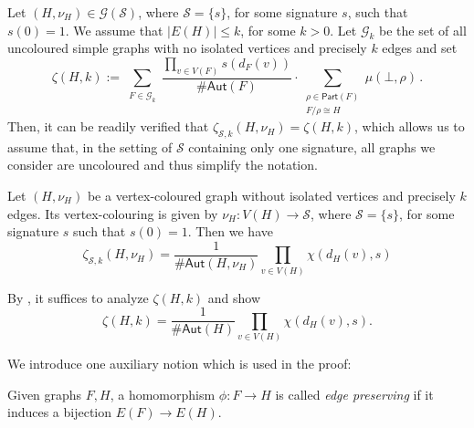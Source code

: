 \documentclass[authorcolumns,numberwithinsect]{no-lipics-v2022}
\begin{document}
\begin{remark}\label{rem:simplified_single_signature}
Let $(H, \nu_H) \in \mathcal{G}(\mathcal{S})$, where $\mathcal{S} = \{s\}$, for some signature $s$, such that $s(0) = 1$. We assume that $|E(H)| \leq k$, for some $k > 0$. Let $\mathcal{G}_k$ be the set of all uncoloured simple graphs with no isolated vertices and precisely $k$ edges and set
\[\zeta(H, k):= \sum_{\substack{F\in \mathcal{G}_k}} \frac{\prod_{v\in V(F)}{s(d_F(v))}}{\#\mathsf{Aut}(F)} \cdot \sum_{\substack{\rho \in \mathsf{Part}(F)\\F/\rho \cong H}}\mu(\bot,\rho)  \,.\]
Then, it can be readily verified that $\zeta_{\mathcal{S}, k}(H, \nu_H) = \zeta(H, k)$, which allows us to assume that, in the setting of $\mathcal{S}$ containing only one signature, all graphs we consider are uncoloured and thus simplify the notation.
\end{remark}

\begin{theorem} \label{Thm:special_case}
Let $(H, \nu_H)$ be a vertex-coloured graph without isolated vertices and precisely $k$ edges. Its vertex-colouring is given by $\nu_H : V(H) \to \mathcal{S}$, where $\mathcal{S} = \{s\}$, for some signature $s$ such that $s(0) = 1$. Then we have
\begin{equation}
    \zeta_{\mathcal{S}, k}(H,\nu_H)=\frac{1}{\#\mathsf{Aut}(H, \nu_H)}\prod_{v \in V(H)} \chi(d_H(v), s)
\end{equation}
\end{theorem}


By , it suffices to analyze $\zeta(H, k)$ and show
\[\zeta(H, k) = \frac1{\#\mathsf{Aut}(H)}\prod_{v \in V(H)}\chi(d_H(v), s).\]

We introduce one auxiliary notion which is used in the proof:
\begin{definition}
Given graphs $F,H$, a homomorphism $\phi : F \to H$ is called \emph{edge preserving} if it induces a bijection $E(F) \to E(H)$. 
\end{definition}
\end{document}
